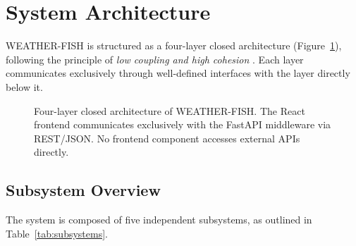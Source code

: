 \documentclass[11pt, a4paper]{article}
\begin{document}
\section{System Architecture}

WEATHER-FISH is structured as a four-layer closed architecture (Figure~\ref{fig:arch}), following the
principle of \textit{low coupling and high cohesion} \citep{martin2003agile}. Each layer communicates
exclusively through well-defined interfaces with the layer directly below it.

\begin{figure}[H]
  \centering
  \caption{Four-layer closed architecture of WEATHER-FISH. The React frontend communicates
           exclusively with the FastAPI middleware via REST/JSON. No frontend component
           accesses external APIs directly.}
  \label{fig:arch}
\end{figure}

\subsection{Subsystem Overview}

The system is composed of five independent subsystems, as outlined in Table~\ref{tab:subsystems}.
\end{document}
